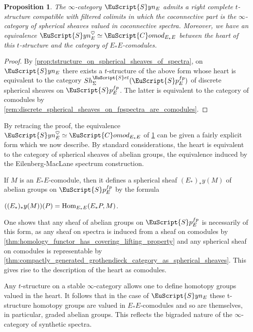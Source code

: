 \documentclass[oneside,a4paper]{amsart}
\newcommand{\euscr}[1]{\EuScript{#1}} %
\newcommand{\Hom}{\textnormal{Hom}} %
\newcommand{\spectra}{\euscr{S}p} %
\newcommand{\sets}{\euscr{S}et} %
\newcommand{\synspectra}{\euscr{S}yn} %
\newcommand{\spectrafp}{\spectra_{E}^{fp}} %
\newcommand{\Comod}{\euscr{C}omod} %
\newcommand{\ComodE}{\Comod_{E_{*}E}} %
\theoremstyle{plain}
\newtheorem{prop}[thm]{Proposition}
\theoremstyle{definition}
\theoremstyle{remark}
\begin{document}
\begin{prop}
\label{prop:synthetic_spectra_admit_a_t_structure}
The $\infty$-category $\synspectra_{E}$ admits a right complete $t$-structure compatible with filtered colimits in which the coconnective part is the $\infty$-category of spherical sheaves valued in coconnective spectra. Moreover, we have an equivalence $\synspectra_{E}^{\heartsuit} \simeq \ComodE$ between the heart of this $t$-structure and the category of $E_{*}E$-comodules. 
\end{prop}

\begin{proof}
By \cref{prop:tstructure_on_spherical_sheaves_of_spectra}, on $\synspectra_{E}$ there exists a $t$-structure of the above form whose heart is equivalent to the category $Sh^{\sets}_{\Sigma}(\spectrafp)$ of discrete spherical sheaves on $\spectrafp$. The latter is equivalent to the category of comodules by \cref{rem:discrete_spherical_sheaves_on_fpspectra_are_comodules}. 
\end{proof}

By retracing the proof, the equivalence $\synspectra_{E}^{\heartsuit} \simeq \ComodE$ of \cref{prop:synthetic_spectra_admit_a_t_structure} can be given a fairly explicit form which we now describe. By standard considerations, the heart is equivalent to the category of spherical sheaves of abelian groups, the equivalence induced by the Eilenberg-MacLane spectrum construction. 

If $M$ is an $E_{*}E$-comodule, then it defines a spherical sheaf $(E_{*})_{*}y(M)$ of abelian groups on $\spectrafp$ by the formula 

\begin{center}
$((E_{*})_{*}y(M))(P) = \Hom_{E_{*}E}(E_{*}P, M)$. 
\end{center}
One shows that any sheaf of abelian groups on $\spectra_{E}^{fp}$ is necessarily of this form, as any sheaf on spectra is induced from a sheaf on comodules by \cref{thm:homology_functor_has_covering_lifting_property} and any spherical sheaf on comodules is representable by \cref{thm:compactly_generated_grothendieck_category_as_spherical_sheaves}. This gives rise to the description of the heart as comodules.

Any $t$-structure on a stable $\infty$-category allows one to define homotopy groups valued in the heart. It follows that in the case of $\synspectra_{E}$ these t-structure homotopy groups are valued in $E_{*}E$-comodules and so are themselves, in particular, graded abelian groups. This reflects the bigraded nature of the $\infty$-category of synthetic spectra. 
\end{document}

